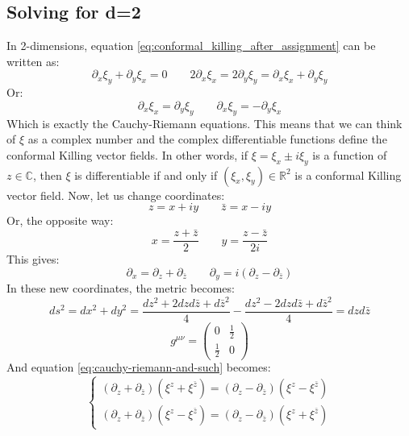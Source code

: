 \documentclass{article}
\newcommand{\R}{\ensuremath{\mathbb{R}}}
\begin{document}
\subsection{Solving for d=2}
In 2-dimensions, equation \ref{eq:conformal_killing_after_assignment} can be written as:
\begin{equation}
    \partial_x \xi_y + \partial_y \xi_x = 0 \qquad 2\partial_x \xi_x = 2\partial_y \xi_y = \partial_x \xi_x + \partial_y \xi_y
\end{equation}
Or:
\begin{equation}
\label{eq:cauchy-riemann-and-such}
    \partial_x \xi_x = \partial_y \xi_y \qquad \partial_x \xi_y = -\partial_y \xi_x
\end{equation}
Which is exactly the Cauchy-Riemann equations. This means that we can think of $\xi$ as a complex number and the complex differentiable functions define the conformal Killing vector fields. In other words, if $\xi = \xi_x \pm i \xi_y$ is a function of $z \in \mathbb{C}$, then $\xi$ is differentiable if and only if $(\xi_x, \xi_y) \in \R^2$ is a conformal Killing vector field.
\newline
Now, let us change coordinates:
\begin{equation}
    z = x + iy \qquad \bar{z} = x - iy
\end{equation}
Or, the opposite way:
\begin{equation}
    x = \frac{z + \bar{z}}{2} \qquad y = \frac{z - \bar{z}}{2i}
\end{equation}
This gives:
\begin{equation}
    \partial_x = \partial_z + \partial_{\bar{z}} \qquad \partial_y = i\left(\partial_z - \partial_{\bar{z}}\right)
\end{equation}
In these new coordinates, the metric becomes:
\begin{equation}
    ds^2 = dx^2 + dy^2 = \frac{dz^2 + 2dzd\bar{z} + d\bar{z}^2}{4} - \frac{dz^2 - 2dzd\bar{z} + d\bar{z}^2}{4} = dzd\bar{z}
\end{equation}
\begin{equation}
    g^{\mu\nu} = \begin{pmatrix} 0 & \frac{1}{2} \\ \frac{1}{2} & 0 \end{pmatrix}
\end{equation}
And equation \ref{eq:cauchy-riemann-and-such} becomes:
\begin{equation}
\begin{cases}
    \left(\partial_z + \partial_{\bar{z}}\right)(\xi^z + \xi^{\bar{z}}) = 
    \left(\partial_z - \partial_{\bar{z}}\right)(\xi^z - \xi^{\bar{z}}) \\
    \left(\partial_z + \partial_{\bar{z}}\right)(\xi^z - \xi^{\bar{z}}) = 
    \left(\partial_z - \partial_{\bar{z}}\right)(\xi^z + \xi^{\bar{z}})
\end{cases}
\end{equation}
\end{document}
